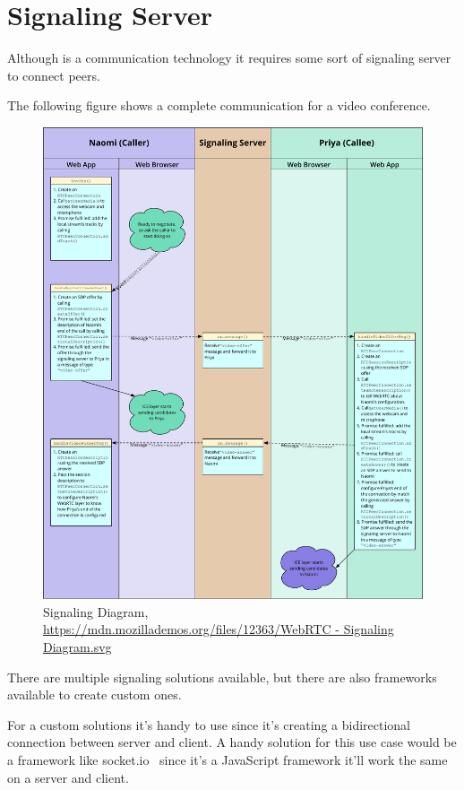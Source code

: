 \section{Signaling Server}
Although  is a  communication technology it requires some sort of signaling server to connect peers. 

The following figure shows a complete communication for a video conference.
\begin{figure}[H]
	\hspace*{-3cm}
	\includegraphics[width=1.4\textwidth,height=1\textheight]{images/SignalingDiagram.pdf}
	\centering
	\caption{Signaling Diagram, \url{https://mdn.mozillademos.org/files/12363/WebRTC - Signaling Diagram.svg}}
	\label{fig:Signaling Diagram}
\end{figure}

There are multiple signaling solutions available, but there are also frameworks available to create custom ones.

For a custom solutions it's handy to use  since it's creating a bidirectional connection between server and client. A handy solution for this use case would be a framework like socket.io~\autocite{socketio} since it's a JavaScript framework it'll work the same on a  server and client.
